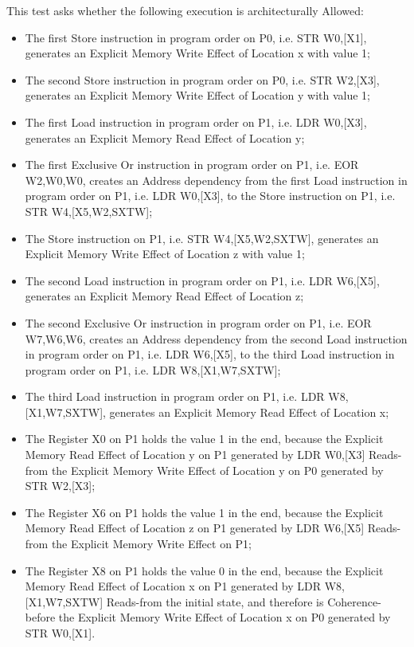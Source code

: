This test asks whether the following execution is architecturally Allowed:

\begin{itemize}
  \item The first Store instruction in program order on P0, i.e. STR W0,[X1], generates an Explicit Memory Write Effect of Location x with value 1;
  \item The second Store instruction in program order on P0, i.e. STR W2,[X3], generates an Explicit Memory Write Effect of Location y with value 1;
  \item The first Load instruction in program order on P1, i.e. LDR W0,[X3], generates an Explicit Memory Read Effect of Location y;
  \item The first Exclusive Or instruction in program order on P1, i.e. EOR W2,W0,W0, creates an Address dependency from the first Load instruction in program order on P1, i.e. LDR W0,[X3], to the Store instruction on P1, i.e. STR W4,[X5,W2,SXTW];
  \item The Store instruction on P1, i.e. STR W4,[X5,W2,SXTW], generates an Explicit Memory Write Effect of Location z with value 1;
  \item The second Load instruction in program order on P1, i.e. LDR W6,[X5], generates an Explicit Memory Read Effect of Location z;
  \item The second Exclusive Or instruction in program order on P1, i.e. EOR W7,W6,W6, creates an Address dependency from the second Load instruction in program order on P1, i.e. LDR W6,[X5], to the third Load instruction in program order on P1, i.e. LDR W8,[X1,W7,SXTW];
  \item The third Load instruction in program order on P1, i.e. LDR W8,[X1,W7,SXTW], generates an Explicit Memory Read Effect of Location x;
  \item The Register X0 on P1 holds the value 1 in the end, because the Explicit Memory Read Effect of Location y on P1 generated by LDR W0,[X3] Reads-from the Explicit Memory Write Effect of Location y on P0 generated by STR W2,[X3];
  \item The Register X6 on P1 holds the value 1 in the end, because the Explicit Memory Read Effect of Location z on P1 generated by LDR W6,[X5] Reads-from the Explicit Memory Write Effect on P1;
  \item The Register X8 on P1 holds the value 0 in the end, because the Explicit Memory Read Effect of Location x on P1 generated by LDR W8,[X1,W7,SXTW] Reads-from the initial state, and therefore is Coherence-before the Explicit Memory Write Effect of Location x on P0 generated by STR W0,[X1].
\end{itemize}
